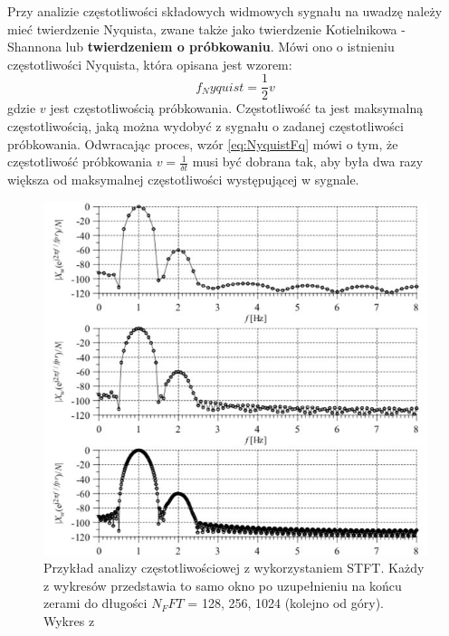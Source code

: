 \documentclass[12pt,a4paper,twoside]{mwart}
\begin{document}
Przy analizie częstotliwości składowych widmowych sygnału na uwadzę należy mieć twierdzenie Nyquista, zwane także jako twierdzenie Kotielnikowa - Shannona lub \textbf{twierdzeniem o próbkowaniu}. Mówi ono o istnieniu częstotliwości Nyquista, która opisana jest wzorem:
\begin{equation} \label{eq:NyquistFq}
  f_Nyquist = \frac{1}{2}v
\end{equation}
gdzie $v$ jest częstotliwością próbkowania. Częstotliwość ta jest maksymalną częstotliwością, jaką można wydobyć z sygnału o zadanej częstotliwości próbkowania. Odwracając proces, wzór \ref{eq:NyquistFq} mówi o tym, że częstotliwość próbkowania $v = \frac{1}{\delta t}$ musi być dobrana tak, aby była dwa razy większa od maksymalnej częstotliwości występującej w sygnale.

\begin{figure}[t]
  \begin{center}
    \includegraphics[scale=0.7]{images/ZeroPadding.jpg}
    \caption{Przykład analizy częstotliwościowej z wykorzystaniem STFT. Każdy z wykresów przedstawia to samo okno po uzupełnieniu na końcu zerami do długości $N_FFT$ = 128, 256, 1024 (kolejno od góry). Wykres z \cite[224]{CyfrowePrzetwarzanieSygnalowOdTeoriiDoZastosowan}}
    \label{fig:ZeroPadding}
  \end{center}
\end{figure}
\end{document}
